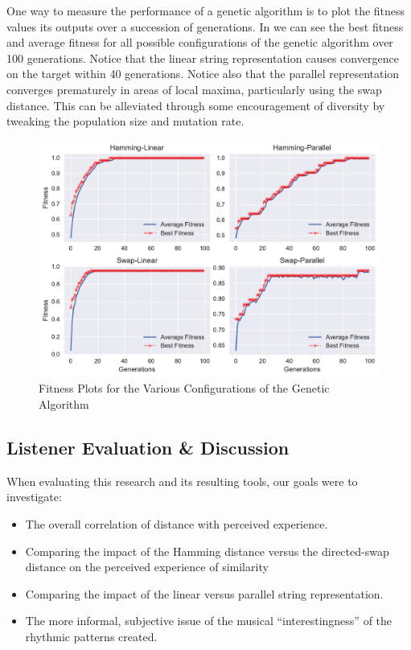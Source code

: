One way to measure the performance of a genetic algorithm is to plot the fitness values its outputs over a succession of generations. In  we can see the best fitness and average fitness for all possible configurations of the genetic algorithm over 100 generations. Notice that the linear string representation causes convergence on the target within 40 generations. Notice also that the parallel representation converges prematurely in areas of local maxima, particularly using the swap distance. This can be alleviated through some encouragement of diversity by tweaking the population size and mutation rate.

\begin{figure}
	\begin{center}
		\includegraphics[width=\figSizeHundred]{ch03_symbolic/figures/best_average_fitness.pdf}
	\end{center}
	\caption[Fitness Plots for the Various Configurations of the Genetic Algorithm]{Fitness Plots for the Various Configurations of the Genetic Algorithm}
	\label{fig:genetic}
\end{figure}

\subsection{Listener Evaluation \& Discussion}

When evaluating this research and its resulting tools, our goals were to investigate:

\begin{itemize}
	\item The overall correlation of distance with perceived experience.
	\item Comparing the impact of the Hamming distance versus the directed-swap distance on the perceived experience of similarity
	\item Comparing the impact of the linear versus parallel string representation.
	\item The more informal, subjective issue of the musical ``interestingness'' of the rhythmic patterns created.
\end{itemize}


